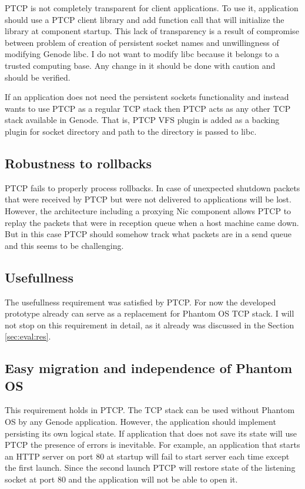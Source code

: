 PTCP is not completely transparent for client applications. To use it, 
application should use a PTCP client library and add function call that will
initialize the library at component startup. This lack of transparency is a
result of compromise between problem of creation of persistent socket names and
unwillingness of modifying Genode libc. I do not want to modify libc because it
belongs to a trusted computing base. Any change in it should be done with
caution and should be verified. 

If an application does not need the persistent sockets functionality and
instead wants to use PTCP as a regular TCP stack then PTCP acts as any other
TCP stack available in Genode. That is, PTCP VFS plugin is added as a backing
plugin for socket directory and path to the directory is passed to libc.

\subsection{Robustness to rollbacks}

PTCP fails to properly process rollbacks. In case of unexpected shutdown
packets that were received by PTCP but were not delivered to applications will
be lost. However, the architecture including a proxying Nic component allows
PTCP to replay the packets that were in reception queue when a host machine
came down. But in this case PTCP should somehow track what packets are 
in a send queue and this seems to be challenging.

\subsection{Usefullness}

The usefullness requirement was satisfied by PTCP. For now the developed
prototype already can serve as a replacement for Phantom OS TCP stack. I will
not stop on this requirement in detail, as it already was discussed in the
Section \ref{sec:eval:res}.

\subsection{Easy migration and independence of Phantom OS}

This requirement holds in PTCP. The TCP stack can be used without Phantom OS by
any Genode application. However, the application should implement persisting
its own logical state. If application that does not save its state will use
PTCP the presence of errors is inevitable. For example, an application that
starts an HTTP server on port 80 at startup will fail to start server each time
except the first launch. Since the second launch PTCP will restore state of
the listening socket at port 80 and the application will not be able to open
it.

